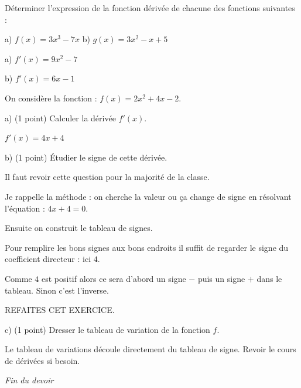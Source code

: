 \documentclass[12pt,a4paper]{exam}
\begin{document}
\begin{questions}

\question[2] Déterminer l'expression de la fonction dérivée de chacune des fonctions suivantes :

\vspace{5pt}
\hspace{1cm}a) $f(x) = 3x^3 - 7x$ \hspace{1cm}b) $g(x) = 3x^2 - x + 5$

{\color{red}a) $f'(x) = 9x^2 - 7$

b) $f'(x) = 6x-1$}

\vspace{10pt}

\question On considère la fonction : $f(x) = 2x^2 + 4x - 2$.

\vspace{5pt}
\hspace{1cm}a) (1 point) Calculer la dérivée $f'(x)$.

{\color{red}$f'(x)=4x + 4$}

\vspace{5pt}
\hspace{1cm}b) (1 point) Étudier le signe de cette dérivée.

{\color{red}
Il faut revoir cette question pour la majorité de la classe.

Je rappelle la méthode : on cherche la valeur ou ça change de signe en résolvant l'équation : 
$4x + 4 = 0$.

Ensuite on construit le tableau de signes.

Pour remplire les bons signes aux bons endroits il suffit de regarder le signe du coefficient directeur : ici $4$.

Comme $4$ est positif alors ce sera d'abord un signe $-$ puis un signe $+$ dans le tableau. Sinon c'est l'inverse.

REFAITES CET EXERCICE.
}

\vspace{5pt}
\hspace{1cm}c) (1 point) Dresser le tableau de variation de la fonction $f$.

{\color{red}
Le tableau de variations découle directement du tableau de signe. Revoir le cours de dérivées si besoin.
}

\end{questions}

\vspace{0.5cm}

\begin{center}
    \textit{Fin du devoir}
\end{center}
\end{document}

